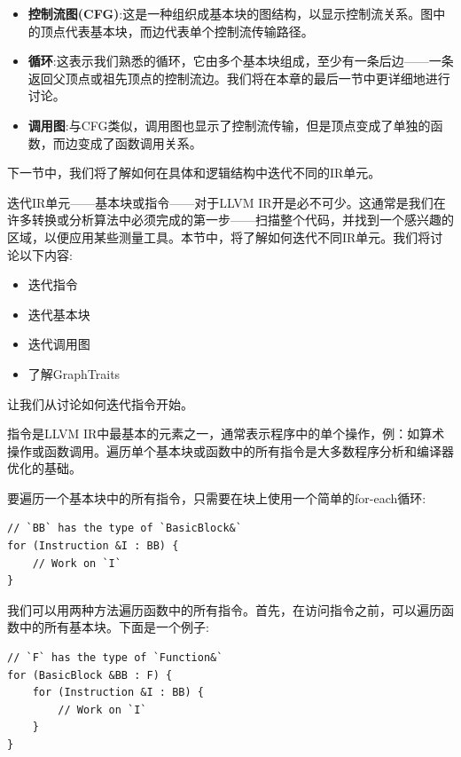 \begin{itemize}
\item \textbf{控制流图(CFG)}:这是一种组织成基本块的图结构，以显示控制流关系。图中的顶点代表基本块，而边代表单个控制流传输路径。

\item \textbf{循环}:这表示我们熟悉的循环，它由多个基本块组成，至少有一条后边——一条返回父顶点或祖先顶点的控制流边。我们将在本章的最后一节中更详细地进行讨论。

\item \textbf{调用图}:与CFG类似，调用图也显示了控制流传输，但是顶点变成了单独的函数，而边变成了函数调用关系。
\end{itemize}

下一节中，我们将了解如何在具体和逻辑结构中迭代不同的IR单元。


迭代IR单元——基本块或指令——对于LLVM IR开是必不可少。这通常是我们在许多转换或分析算法中必须完成的第一步——扫描整个代码，并找到一个感兴趣的区域，以便应用某些测量工具。本节中，将了解如何迭代不同IR单元。我们将讨论以下内容:

\begin{itemize}
\item 迭代指令
\item 迭代基本块
\item 迭代调用图
\item 了解GraphTraits
\end{itemize}

让我们从讨论如何迭代指令开始。


指令是LLVM IR中最基本的元素之一，通常表示程序中的单个操作，例：如算术操作或函数调用。遍历单个基本块或函数中的所有指令是大多数程序分析和编译器优化的基础。

要遍历一个基本块中的所有指令，只需要在块上使用一个简单的for-each循环:

\begin{lstlisting}[style=styleCXX]
// `BB` has the type of `BasicBlock&`
for (Instruction &I : BB) {
	// Work on `I`
}
\end{lstlisting}

我们可以用两种方法遍历函数中的所有指令。首先，在访问指令之前，可以遍历函数中的所有基本块。下面是一个例子:

\begin{lstlisting}[style=styleCXX]
// `F` has the type of `Function&`
for (BasicBlock &BB : F) {
	for (Instruction &I : BB) {
		// Work on `I`
	}
}
\end{lstlisting}

